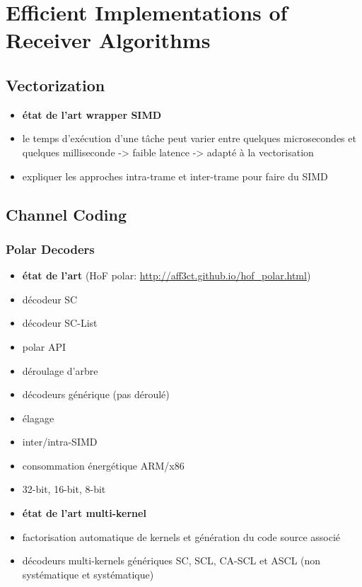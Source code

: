 \chapter{Efficient Implementations of Receiver Algorithms}

\section{Vectorization~\cite{Cassagne2018}}

\begin{itemize}
  \item \textbf{état de l'art wrapper SIMD}
  \item le temps d'exécution d'une tâche peut varier entre quelques
        microsecondes et quelques milliseconde -> faible latence -> adapté à la
        vectorisation
  \item expliquer les approches intra-trame et inter-trame pour faire du SIMD
\end{itemize}

\section{Channel Coding}

\subsection{Polar Decoders~\cite{Cassagne2015c,Cassagne2016b,Leonardon2019}}

\begin{itemize}
  \item \textbf{état de l'art} (HoF polar: \url{http://aff3ct.github.io/hof_polar.html})
  \item décodeur SC
  \item décodeur SC-List
  \item polar API
  \item déroulage d'arbre
  \item décodeurs générique (pas déroulé)
  \item élagage
  \item inter/intra-SIMD
  \item consommation énergétique ARM/x86
  \item 32-bit, 16-bit, 8-bit
\end{itemize}

\begin{itemize}
  \item \textbf{état de l'art multi-kernel}
  \item factorisation automatique de kernels et génération du code source associé
  \item décodeurs multi-kernels génériques SC, SCL, CA-SCL et ASCL (non systématique et systématique)
\end{itemize}

